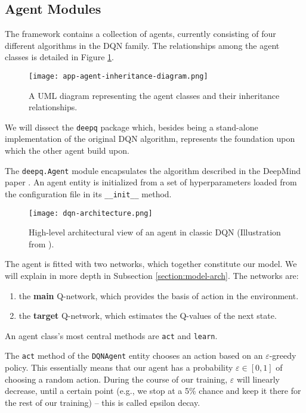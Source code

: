 \subsection{Agent Modules} \label{section:agent-modules}

The framework contains a collection of agents, currently consisting of four different algorithms in the DQN family.
The relationships among the agent classes is detailed in Figure \ref{fig:agent-class-diagram}.

\begin{figure}[h]
    \centering
    \texttt{[image: app-agent-inheritance-diagram.png]}
    \caption{A UML diagram representing the agent classes and their inheritance relationships.}
    \label{fig:agent-class-diagram}
\end{figure}

We will dissect the \texttt{deepq} package which, besides being a stand-alone implementation of the original DQN algorithm, represents the foundation upon which the other agent build upon.

The \texttt{deepq.Agent} module encapsulates the algorithm described in the DeepMind paper \cite{atari-dqn}.
An agent entity is initialized from a set of hyperparameters loaded from the configuration file in its \verb|__init__| method.

\begin{figure}
    \centering
    \texttt{[image: dqn-architecture.png]}
    \caption{High-level architectural view of an agent in classic DQN (Illustration from \cite{mpmdrl}).}
    \label{fig:dqn-architecture}
\end{figure}

The agent is fitted with two networks, which together constitute our model. We will explain in more depth in Subsection \ref{section:model-arch}. The networks are:
\begin{enumerate}
    \item the \textbf{main} Q-network, which provides the basis of action in the environment.
    \item the \textbf{target} Q-network, which estimates the Q-values of the next state.
\end{enumerate}

An agent class’s most central methods are \texttt{act} and \texttt{learn}.

The \texttt{act} method of the \texttt{DQNAgent} entity chooses an action based on an $\varepsilon$-greedy policy.
This essentially means that our agent has a probability $\varepsilon \in [0, 1]$ of choosing a random action.
During the course of our training, $\varepsilon$ will linearly decrease, until a certain point (e.g., we stop at a 5\% chance and keep it there for the rest of our training) -- this is called epsilon decay.


